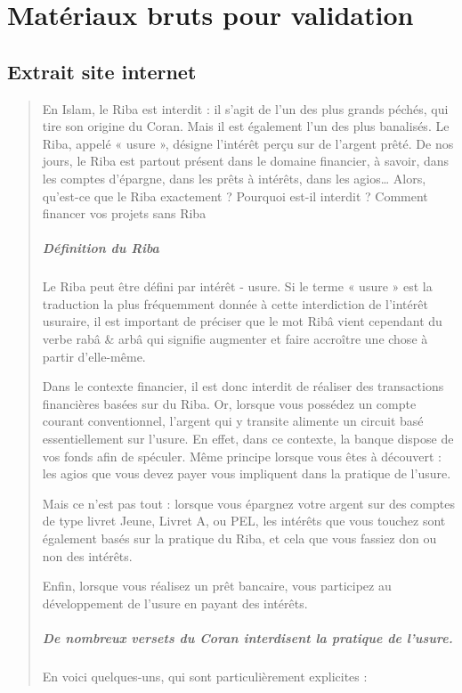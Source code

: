 \chapter{Matériaux bruts pour validation}


\section{Extrait site internet}
\begin{quote}
En Islam, le Riba est interdit : il s’agit de l’un des plus grands péchés, qui tire son origine du Coran. Mais il est également l’un des plus banalisés. Le Riba, appelé « usure », désigne l’intérêt perçu sur de l’argent prêté. De nos jours, le Riba est partout présent dans le domaine financier, à savoir, dans les comptes d’épargne, dans les prêts à intérêts, dans les agios… Alors, qu’est-ce que le Riba exactement ? Pourquoi est-il interdit ? Comment financer vos projets sans Riba 
\paragraph{Définition du Riba}

Le Riba peut être défini par intérêt - usure. Si le terme « usure » est la traduction la plus fréquemment donnée à cette interdiction de l’intérêt usuraire, il est important de préciser que le mot Ribâ vient cependant du verbe rabâ \& arbâ qui signifie augmenter et faire accroître une chose à partir d’elle-même. 

Dans le contexte financier, il est donc interdit de réaliser des transactions financières basées sur du Riba. Or, lorsque vous possédez un compte courant conventionnel, l’argent qui y transite alimente un circuit basé essentiellement sur l’usure. En effet, dans ce contexte, la banque dispose de vos fonds afin de spéculer. Même principe lorsque vous êtes à découvert : les agios que vous devez payer vous impliquent dans la pratique de l’usure.

Mais ce n’est pas tout : lorsque vous épargnez votre argent sur des comptes de type livret Jeune, Livret A, ou PEL, les intérêts que vous touchez sont également basés sur la pratique du Riba, et cela que vous fassiez don ou non des intérêts.

Enfin, lorsque vous réalisez un prêt bancaire, vous participez au développement de l’usure en payant des intérêts. 

\paragraph{De nombreux versets du Coran interdisent la pratique de l’usure.}     En voici quelques-uns, qui sont particulièrement explicites :


\end{quote}
